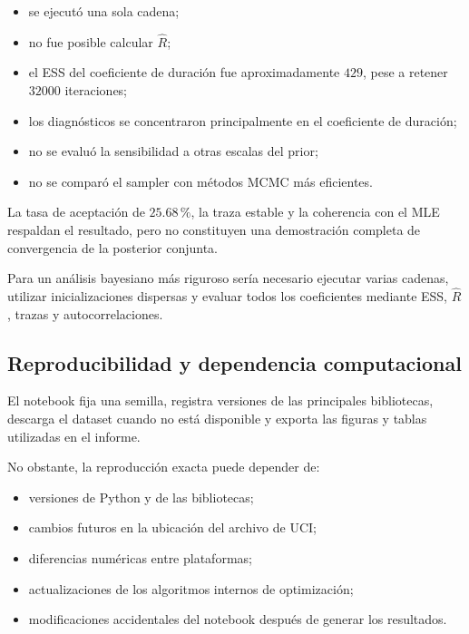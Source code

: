 \begin{itemize}
    \item se ejecutó una sola cadena;

    \item no fue posible calcular \(\widehat{R}\);

    \item el ESS del coeficiente de duración fue aproximadamente \(429\),
    pese a retener \(\num{32000}\) iteraciones;

    \item los diagnósticos se concentraron principalmente en el
    coeficiente de duración;

    \item no se evaluó la sensibilidad a otras escalas del prior;

    \item no se comparó el sampler con métodos MCMC más eficientes.
\end{itemize}

La tasa de aceptación de \(25.68\,\%\), la traza estable y la coherencia
con el MLE respaldan el resultado, pero no constituyen una demostración
completa de convergencia de la posterior conjunta.

Para un análisis bayesiano más riguroso sería necesario ejecutar varias
cadenas, utilizar inicializaciones dispersas y evaluar todos los
coeficientes mediante ESS, \(\widehat{R}\), trazas y autocorrelaciones.

\subsection{Reproducibilidad y dependencia computacional}

El notebook fija una semilla, registra versiones de las principales
bibliotecas, descarga el dataset cuando no está disponible y exporta las
figuras y tablas utilizadas en el informe.

No obstante, la reproducción exacta puede depender de:

\begin{itemize}
    \item versiones de Python y de las bibliotecas;

    \item cambios futuros en la ubicación del archivo de UCI;

    \item diferencias numéricas entre plataformas;

    \item actualizaciones de los algoritmos internos de optimización;

    \item modificaciones accidentales del notebook después de generar
    los resultados.
\end{itemize}

